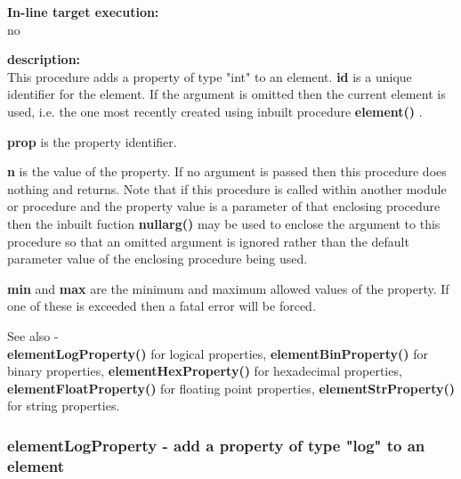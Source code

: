             {\bf In-line target execution:} \\
            no

            {\bf description:} \\
            This procedure adds a property of type "int" to an element. {\bf
            id} is a unique identifier for the element. If the argument is
            omitted then the current element is used, i.e. the one most recently
            created using inbuilt procedure {\bf element()}
            .
            
            {\bf prop} is the property identifier.

            {\bf n} is the value of the property. If no argument is passed then
            this procedure does nothing and returns. Note that if this procedure
            is called within another module or procedure and the property value
            is a parameter of that enclosing procedure then the inbuilt fuction
            {\bf nullarg()}  may be used to enclose the
            argument to this procedure so that an omitted argument is ignored
            rather than the default parameter value of the enclosing procedure
            being used.

            {\bf min} and {\bf max} are the minimum and maximum allowed values
            of the property. If one of these is exceeded then a fatal error
            will be forced.
            
            See also - \\
            {\bf elementLogProperty()}  for logical properties,
            {\bf elementBinProperty()}  for binary properties,
            {\bf elementHexProperty()}  for hexadecimal properties,
            {\bf elementFloatProperty()}  for floating point properties,
            {\bf elementStrProperty()}  for string properties.
         





        \subsubsection{elementLogProperty - add a property of type "log" to an element}\label{sec:lpelementLogProperty}
            
